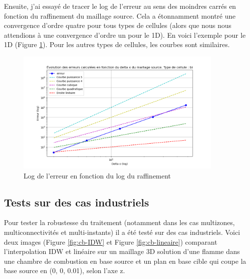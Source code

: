 Ensuite, j'ai essayé de tracer le log de l'erreur au sens des moindres carrés en fonction du raffinement du maillage source. Cela a étonnamment montré une convergence d'ordre quatre pour tous types de cellules (alors que nous nous attendions à une convergence d'ordre un pour le 1D). En voici l'exemple pour le 1D (Figure \ref{fig:bi}). Pour les autres types de cellules, les courbes sont similaires.
\begin{figure}[H]
    \centering
    \includegraphics[width=0.90\textwidth]{images/err_puissance2_bi.png}
    \caption{Log de l'erreur en fonction du log du raffinement}
    \label{fig:bi}
\end{figure}


\subsection{Tests sur des cas industriels}

Pour tester la robustesse du traitement (notamment dans les cas multizones, multiconnectivités et multi-instants) il a été testé sur des cas industriels.
Voici deux images (Figure \ref{fig:cb-IDW} et Figure \ref{fig:cb-lineaire}) comparant l'interpolation IDW et linéaire sur un maillage 3D solution d'une flamme dans une chambre de combustion en base source et un plan en base cible qui coupe la base source en (0, 0, 0.01), selon l'axe z.

